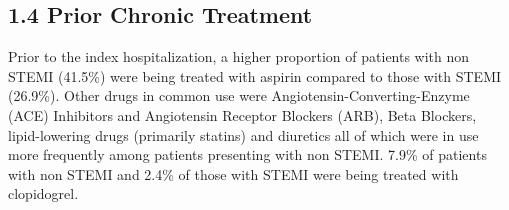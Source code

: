 \documentclass[
]{article}
\begin{document}
\pagebreak

\subsection{1.4 Prior Chronic Treatment}\label{prior-chronic-treatment}

Prior to the index hospitalization, a higher proportion of patients with
non STEMI (41.5\%) were being treated with aspirin compared to those
with STEMI (26.9\%). Other drugs in common use were
Angiotensin-Converting-Enzyme (ACE) Inhibitors and Angiotensin Receptor
Blockers (ARB), Beta Blockers, lipid-lowering drugs (primarily statins)
and diuretics all of which were in use more frequently among patients
presenting with non STEMI. 7.9\% of patients with non STEMI and 2.4\% of
those with STEMI were being treated with clopidogrel.

~
\end{document}
